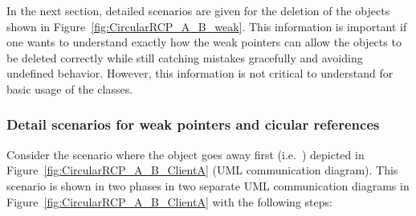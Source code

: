 \documentclass[pdf,ps2pdf,11pt]{SANDreport}
\begin{document}
In the next section, detailed scenarios are given for the deletion of
the objects shown in Figure~\ref{fig:CircularRCP_A_B_weak}.  This
information is important if one wants to understand exactly how the
weak pointers can allow the objects to be deleted correctly while
still catching mistakes gracefully and avoiding undefined behavior.
However, this information is not critical to understand for basic
usage of the classes.


%
{}\subsubsection*{Detail scenarios for weak pointers and cicular references}
%

Consider the scenario where the {} object goes away first
(i.e.\ {}) depicted in
Figure~\ref{fig:CircularRCP_A_B_ClientA} (UML communication diagram).
This scenario is shown in two phases in two separate UML communication
diagrams in Figure~\ref{fig:CircularRCP_A_B_ClientA} with the
following steps:
\end{document}
